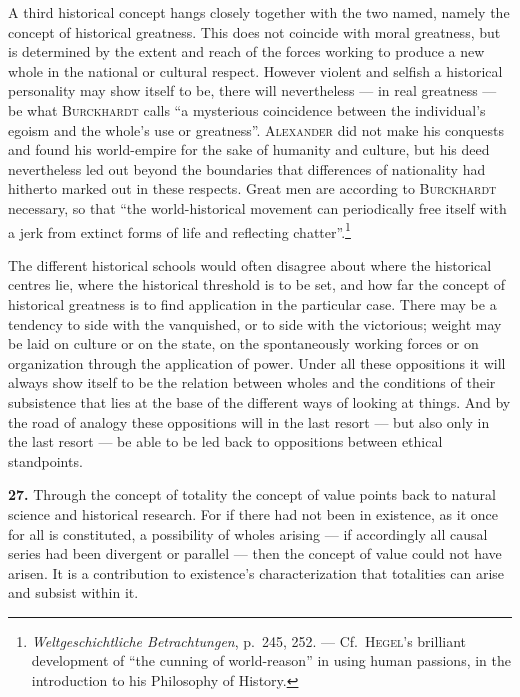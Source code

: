 \documentclass[12pt]{book}
\newcommand{\hnum}[1]{\textbf{#1.}\enspace}
\newcommand{\opage}[1]{\marginnote{\footnotesize\textit{[#1]}}}
\begin{document}
A third historical concept hangs closely together with the two named, namely the concept
of historical greatness. This does not coincide with moral greatness, but is determined by
the extent and reach of the forces working to produce a new whole in the national or
cultural respect. However violent and selfish a historical personality may show itself to
be, there will nevertheless --- in real greatness --- be what \textsc{Burckhardt} calls
``a mysterious coincidence between the individual's egoism and the whole's use or
greatness''. \textsc{Alexander} did not make his conquests and found his world-empire for
the sake of humanity and culture, but his deed nevertheless led out beyond the boundaries
that differences of nationality had hitherto marked out in these respects. Great men are
according to \textsc{Burckhardt} \opage{72}necessary, so that ``the world-historical movement can
periodically free itself with a jerk from extinct forms of life and reflecting
chatter''.\footnote{\textit{Weltgeschichtliche Betrachtungen}, p.\ 245, 252. --- Cf.\
\textsc{Hegel}'s brilliant development of ``the cunning of world-reason'' in using human
passions, in the introduction to his Philosophy of History.}

The different historical schools would often disagree about where the historical centres
lie, where the historical threshold is to be set, and how far the concept of historical
greatness is to find application in the particular case. There may be a tendency to side
with the vanquished, or to side with the victorious; weight may be laid on culture or on
the state, on the spontaneously working forces or on organization through the application
of power. Under all these oppositions it will always show itself to be the relation
between wholes and the conditions of their subsistence that lies at the base of the
different ways of looking at things. And by the road of analogy these oppositions will in
the last resort --- but also only in the last resort --- be able to be led back to
oppositions between ethical standpoints.

\hnum{27} Through the concept of totality the concept of value points back to natural
science and historical research. For if there had not been in existence, as it once for
all is constituted, a possibility of wholes arising --- if accordingly all causal series
had been divergent or parallel --- then the concept of value could not have arisen. It is
a contribution to existence's characterization that totalities can arise and subsist
within it.
\end{document}
